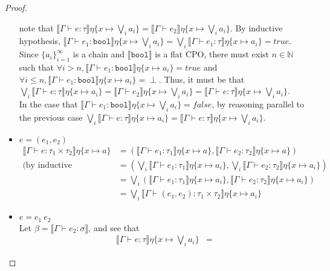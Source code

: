 \begin{proof}
\begin{itemize}
note that $\llbracket \Gamma \vdash e : 
\tau \rrbracket\eta\{x\mapsto  \bigvee_i a_i\} =  \llbracket \Gamma \vdash e_2 \rrbracket\eta\{x\mapsto  \bigvee_i a_i\}$. 
By inductive hypothesis, 
$\llbracket \Gamma \vdash e_1 : \texttt{bool} \rrbracket\eta\{x\mapsto  \bigvee_i a_i\} = 
\bigvee_i\llbracket \Gamma \vdash e_1 : \tau \rrbracket\eta\{x\mapsto a_i\} = true$. 
Since $\{a_i\}^{\infty}_{i=1}$ is a chain 
and $\llbracket\texttt{bool}\rrbracket$ is a flat CPO, there must exist $n \in \mathbb{N}$ such that 
$\forall i > n, \llbracket \Gamma \vdash e_1 : \texttt{bool}
\rrbracket\eta\{x\mapsto a_i\} = true$ and 
$\forall i \leq n, \llbracket \Gamma \vdash e_1 : \texttt{bool}\rrbracket\eta\{x\mapsto  a_i\} = \perp$. Thus, it must 
be that $\bigvee_i \llbracket \Gamma \vdash e : \tau \rrbracket\eta\{x\mapsto a_i\} = 
\llbracket \Gamma \vdash e_2 \rrbracket\eta\{x\mapsto  \bigvee_i a_i\} = 
\llbracket \Gamma \vdash e : \tau \rrbracket\eta\{x\mapsto  \bigvee_i a_i\}$. \\ 
%
In the case that $\llbracket \Gamma \vdash e_1 : \texttt{bool} \rrbracket\eta\{x\mapsto  \bigvee_i a_i\} = false$, by reasoning parallel to the previous case $\bigvee_i \llbracket \Gamma \vdash e : \tau \rrbracket\eta\{x\mapsto a_i\}  = 
\llbracket \Gamma \vdash e : \tau \rrbracket\eta\{x\mapsto  \bigvee_i a_i\}$.
 \item $e = (e_1,e_2)$ 
 \begin{align*}
 \llbracket \Gamma \vdash e : \tau_1 \times \tau_2\rrbracket\eta\{x \mapsto a\}
 &= (\llbracket \Gamma \vdash e_1 : \tau_1 \rrbracket\eta\{x \mapsto a\}, \llbracket \Gamma \vdash e_2 : \tau_2 \rrbracket\eta\{x \mapsto a\}) \\
 \text{(by inductive hypothesis)} &= (\bigvee_i \llbracket \Gamma \vdash e_1 : \tau_1 \rrbracket\eta\{x \mapsto a_i\},
 \bigvee_i \llbracket \Gamma \vdash e_2 : \tau_2 \rrbracket\eta\{x \mapsto a_i\}) \\
 &= \bigvee_i ( \llbracket \Gamma \vdash e_1 : \tau_1 \rrbracket\eta\{x \mapsto a_i\},
  \llbracket \Gamma \vdash e_2 : \tau_2 \rrbracket\eta\{x \mapsto a_i\}) \\
  &= \bigvee_i \llbracket \Gamma \vdash (e_1, e_2): \tau_1 \times \tau_2 \rrbracket\eta\{x\mapsto a_i\}
  \end{align*}
 \item $ e = e_1 \ e_2$ \\ 
Let $\beta = \llbracket \Gamma \vdash e_2 : \sigma \rrbracket$, and see that
\begin{align*}
\llbracket \Gamma \vdash e : \tau \rrbracket\eta\{x \mapsto \bigvee_i a_i \} &=

\end{align*}
\end{itemize}
\end{proof}
